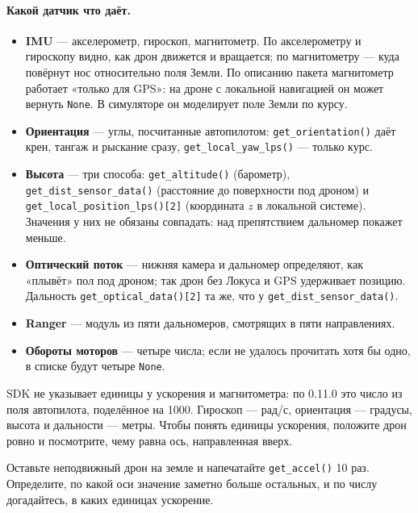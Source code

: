 \paragraph{Какой датчик что даёт.}
\begin{itemize}
    \item \textbf{IMU} --- акселерометр, гироскоп, магнитометр. По акселерометру и гироскопу видно, как дрон движется и вращается; по магнитометру --- куда повёрнут нос относительно поля Земли. По описанию пакета магнитометр работает «только для GPS»: на дроне с локальной навигацией он может вернуть \verb|None|. В симуляторе он моделирует поле Земли по курсу.
    \item \textbf{Ориентация} --- углы, посчитанные автопилотом: \verb|get_orientation()| даёт крен, тангаж и рыскание сразу, \verb|get_local_yaw_lps()| --- только курс.
    \item \textbf{Высота} --- три способа: \verb|get_altitude()| (барометр), \verb|get_dist_sensor_data()| (расстояние до поверхности под дроном) и \verb|get_local_position_lps()[2]| (координата $z$ в локальной системе). Значения у них не обязаны совпадать: над препятствием дальномер покажет меньше.
    \item \textbf{Оптический поток} --- нижняя камера и дальномер определяют, как «плывёт» пол под дроном; так дрон без Локуса и GPS удерживает позицию. Дальность \verb|get_optical_data()[2]| та же, что у \verb|get_dist_sensor_data()|.
    \item \textbf{Ranger} --- модуль из пяти дальномеров, смотрящих в пяти направлениях.
    \item \textbf{Обороты моторов} --- четыре числа; если не удалось прочитать хотя бы одно, в списке будут четыре \verb|None|.
\end{itemize}

\begin{infobox}
SDK не указывает единицы у ускорения и магнитометра: по 0.11.0 это число из поля автопилота, поделённое на 1000. Гироскоп --- рад/с, ориентация --- градусы, высота и дальности --- метры. Чтобы понять единицы ускорения, положите дрон ровно и посмотрите, чему равна ось, направленная вверх.
\end{infobox}

\begin{taskbox}
Оставьте неподвижный дрон на земле и напечатайте \verb|get_accel()| 10 раз. Определите, по какой оси значение заметно больше остальных, и по числу догадайтесь, в каких единицах ускорение.
\end{taskbox}

